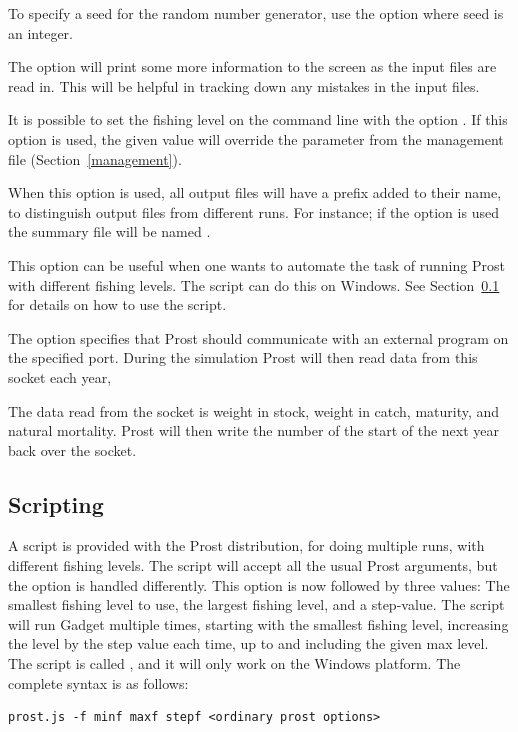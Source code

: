 \documentclass[12pt,twoside,a4paper]{article}
\begin{document}
To specify a seed for the random number generator, use the option
 where seed is an integer.

The option  will print some more information to the screen
as the input files are read in. This will be helpful in tracking down any
mistakes in the input files.

It is possible to set the fishing level on the command line with the
option . If this option is used, the given value
will override the  parameter from the management
file (Section~\ref{management}). 

When this option is used, all output files will have a prefix added to
their name, to distinguish output files from different runs. For
instance;  if the option  is used the summary file
will be named .

This option can be useful when one
wants to automate the task of running Prost with different fishing
levels. The script  can do this on Windows. See
Section~\ref{script} for details on how to use the 
script. 

The option  specifies that Prost should communicate
with an external program on the specified port. During the simulation
Prost will then read data from this socket each year, 

The data read from the socket is weight in stock, weight in catch,
maturity, and natural mortality. Prost will then write the number of
the start of the next year back over the socket.

\subsection{Scripting}
\label{script}
A script is provided with the Prost distribution, for doing multiple
runs, with different fishing levels. The script will accept all the
usual Prost arguments, but the  option is handled
differently. This option is now followed by three values: The smallest
fishing level to use, the largest fishing level, and a step-value. The
script will run Gadget multiple times, starting with the smallest
fishing level, increasing the level by the step value each time, up to
and including the given max level. The script is called
, and it will only work on the Windows platform. The
complete syntax is as follows: 

\begin{verbatim}
prost.js -f minf maxf stepf <ordinary prost options>
\end{verbatim}
\end{document}
